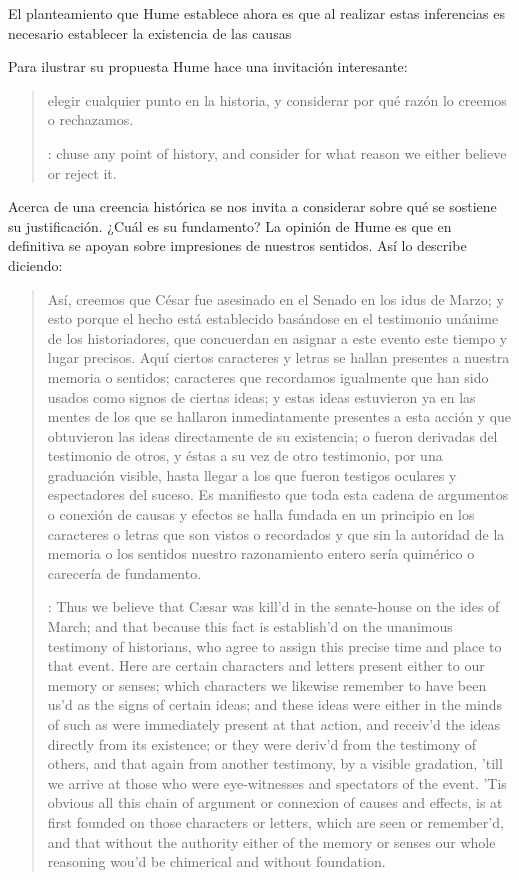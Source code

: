 El planteamiento que Hume establece ahora es que al realizar estas inferencias
es necesario establecer la existencia de las causas

Para ilustrar su propuesta Hume hace una invitación interesante:
  \blockquote[{\cite[?]{humetreatise}}: chuse any point of history, and consider
  for what reason we either believe or reject it.]{elegir cualquier punto en la
    historia, y considerar por qué razón lo creemos o rechazamos.} Acerca de una
  creencia histórica se nos invita a considerar sobre qué se sostiene su
  justificación. ¿Cuál es su fundamento? La opinión de Hume es que en definitiva
  se apoyan sobre impresiones de nuestros sentidos. Así lo describe diciendo:
  \blockquote[{\cite[?]{humetratise}}: Thus we believe that Cæsar was kill’d in
  the senate-house on the ides of March; and that because this fact is establish’d
  on the unanimous testimony of historians, who agree to assign this precise time
  and place to that event. Here are certain characters and letters present either
  to our memory or senses; which characters we likewise remember to have been us’d
  as the signs of certain ideas; and these ideas were either in the minds of such
  as were immediately present at that action, and receiv’d the ideas directly from
  its existence; or they were deriv’d from the testimony of others, and that again
  from another testimony, by a visible gradation, ’till we arrive at those who
  were eye-witnesses and spectators of the event. ’Tis obvious all this chain of
  argument or connexion of causes and effects, is at first founded on those
  characters or letters, which are seen or remember’d, and that without the
  authority either of the memory or senses our whole reasoning wou’d be chimerical
  and without foundation.]{Así, creemos que César fue asesinado en el Senado en
    los idus de Marzo; y esto porque el hecho está establecido basándose en el
    testimonio unánime de los historiadores, que concuerdan en asignar a este
    evento este tiempo y lugar precisos. Aquí ciertos caracteres y letras se
    hallan presentes a nuestra memoria o sentidos; caracteres que recordamos
    igualmente que han sido usados como signos de ciertas ideas; y estas ideas
    estuvieron ya en las mentes de los que se hallaron inmediatamente presentes a
    esta acción y que obtuvieron las ideas directamente de su existencia; o fueron
    derivadas del testimonio de otros, y éstas a su vez de otro testimonio, por
    una graduación visible, hasta llegar a los que fueron testigos oculares y
    espectadores del suceso. Es manifiesto que toda esta cadena de argumentos o
    conexión de causas y efectos se halla fundada en un principio en los
    caracteres o letras que son vistos o recordados y que sin la autoridad de la
    memoria o los sentidos nuestro razonamiento entero sería quimérico o carecería
    de fundamento.}

